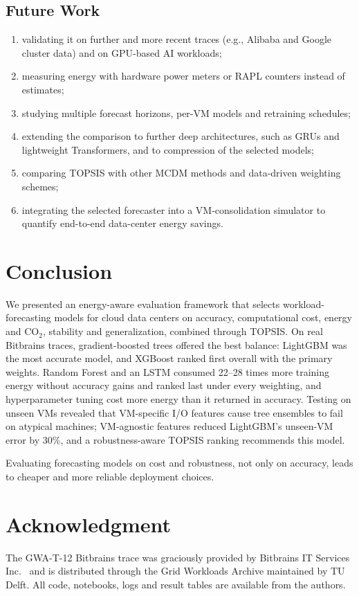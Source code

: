 \documentclass[conference,letterpaper,10pt]{IEEEtran}
\begin{document}
\subsection{Future Work}
\begin{enumerate}
  \item validating it on further and more recent traces (e.g., Alibaba and Google cluster data) and on GPU-based AI workloads;
  \item measuring energy with hardware power meters or RAPL counters instead of estimates;
  \item studying multiple forecast horizons, per-VM models and retraining schedules;
  \item extending the comparison to further deep architectures, such as GRUs and lightweight Transformers, and to compression of the selected models;
  \item comparing TOPSIS with other MCDM methods and data-driven weighting schemes;
  \item integrating the selected forecaster into a VM-consolidation simulator to quantify end-to-end data-center energy savings.
\end{enumerate}

\section{Conclusion}
\label{sec:conclusion}

We presented an energy-aware evaluation framework that selects workload-forecasting models for cloud data centers on accuracy, computational cost, energy and CO$_2$, stability and generalization, combined through TOPSIS. On real Bitbrains traces, gradient-boosted trees offered the best balance: LightGBM was the most accurate model, and XGBoost ranked first overall with the primary weights. Random Forest and an LSTM consumed 22--28 times more training energy without accuracy gains and ranked last under every weighting, and hyperparameter tuning cost more energy than it returned in accuracy. Testing on unseen VMs revealed that VM-specific I/O features cause tree ensembles to fail on atypical machines; VM-agnostic features reduced LightGBM's unseen-VM error by 30\%, and a robustness-aware TOPSIS ranking recommends this model.

Evaluating forecasting models on cost and robustness, not only on accuracy, leads to cheaper and more reliable deployment choices.

\section*{Acknowledgment}
The GWA-T-12 Bitbrains trace was graciously provided by Bitbrains IT Services Inc.\ \cite{shen2015bitbrains} and is distributed through the Grid Workloads Archive \cite{iosup2008gwa} maintained by TU Delft. All code, notebooks, logs and result tables are available from the authors.



\end{document}
